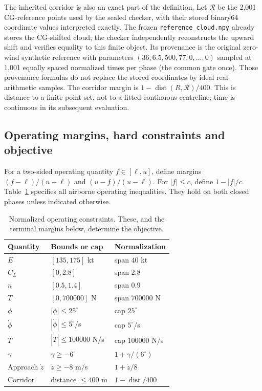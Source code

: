 The inherited corridor is also an exact part of the definition. Let $\mathcal R$ be the 2,001 CG-reference points used by the sealed checker, with their stored binary64 coordinate values interpreted exactly. The frozen \texttt{reference\_cloud.npy} already stores the CG-shifted cloud; the checker independently reconstructs the upward shift and verifies equality to this finite object. Its provenance is the original zero-wind synthetic reference with parameters $(36,6.5,500,77,0,\ldots,0)$ sampled at 1,001 equally spaced normalized times per phase (the common gate once). Those provenance formulas do not replace the stored coordinates by ideal real-arithmetic samples. The corridor margin is $1-\operatorname{dist}(R,\mathcal R)/400$. This is distance to a finite point set, not to a fitted continuous centreline; time is continuous in its subsequent evaluation.

\subsection{Operating margins, hard constraints and objective}
For a two-sided operating quantity $f\in[\ell,u]$, define margins $(f-\ell)/(u-\ell)$ and $(u-f)/(u-\ell)$. For $|f|\leq c$, define $1-|f|/c$. Table~\ref{tab:margins} specifies all airborne operating inequalities. They hold on both closed phases unless indicated otherwise.
\begin{table}[htbp]\centering\caption{Normalized operating constraints. These, and the terminal margins below, determine the objective.}\label{tab:margins}
\begin{tabular}{lll}\toprule
Quantity & Bounds or cap & Normalization\\\midrule
$E$ & $[135,175]$ kt & span $40$ kt\\
$C_L$ & $[0,2.8]$ & span $2.8$\\
$n$ & $[0.5,1.4]$ & span $0.9$\\
$T$ & $[0,700000]$ N & span $700000$ N\\
$\phi$ & $|\phi|\leq25^\circ$ & cap $25^\circ$\\
$\dot\phi$ & $|\dot\phi|\leq5^\circ$/s & cap $5^\circ$/s\\
$\dot T$ & $|\dot T|\leq100000$ N/s & cap $100000$ N/s\\
$\gamma$ & $\gamma\geq-6^\circ$ & $1+\gamma/(6^\circ)$\\
Approach $\dot z$ & $\dot z\geq-8$ m/s & $1+\dot z/8$\\
Corridor & distance $\leq400$ m & $1-\operatorname{dist}/400$\\\bottomrule
\end{tabular}\end{table}

